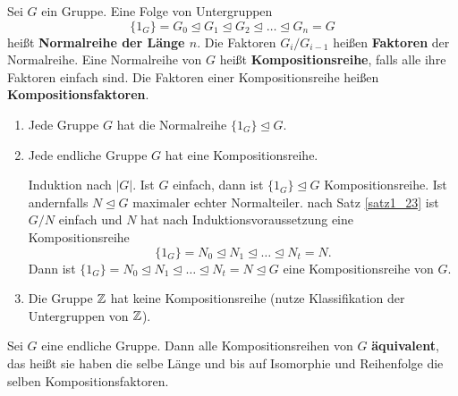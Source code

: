\begin{definition}
	Sei $G$ ein Gruppe. Eine Folge von Untergruppen
	\[\{1_G\} = G_0 \unlhd G_1 \unlhd G_2 \unlhd \dots \unlhd G_n = G\]
	heißt \textbf{Normalreihe der Länge $n$}. Die Faktoren $G_i/G_{i-1}$ heißen \textbf{Faktoren} der Normalreihe. Eine Normalreihe von $G$ heißt \textbf{Kompositionsreihe}, falls alle ihre Faktoren einfach sind. Die Faktoren einer Kompositionsreihe heißen \textbf{Kompositionsfaktoren}.
\end{definition}
\begin{rem}\label{rem2_15}
	\begin{enumerate}[label=(\roman*)]
		\item Jede Gruppe $G$ hat die Normalreihe $\{1_G\} \unlhd G$.
		\item Jede endliche Gruppe $G$ hat eine Kompositionsreihe.
		
		Induktion nach $|G|$. Ist $G$ einfach, dann ist $\{1_G\} \unlhd G$ Kompositionsreihe. Ist andernfalls $N \unlhd G$ maximaler echter Normalteiler. nach Satz \ref{satz1_23} ist $G/N$ einfach und $N$ hat nach Induktionsvoraussetzung eine Kompositionsreihe
		\[\{1_G\} = N_0 \unlhd N_1 \unlhd \dots \unlhd N_t = N.\]
		Dann ist $\{1_G\} = N_0 \unlhd N_1 \unlhd \dots \unlhd N_t = N \unlhd G$ eine Kompositionsreihe von $G$.
		
		\item Die Gruppe $\mathbb{Z}$ hat keine Kompositionsreihe (nutze Klassifikation der Untergruppen von $\mathbb{Z}$).
	\end{enumerate}
\end{rem}
\begin{thm}\label{Satz von Jordan-Hölder}
	Sei $G$ eine endliche Gruppe. Dann alle Kompositionsreihen von $G$ \textbf{äquivalent}, das heißt sie haben die selbe Länge und bis auf Isomorphie und Reihenfolge die selben Kompositionsfaktoren.
\end{thm}
